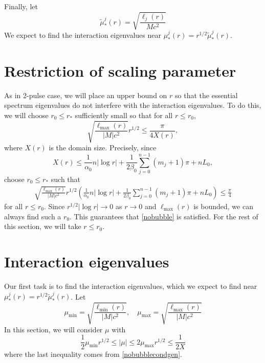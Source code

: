 \documentclass[thesis.tex]{subfiles}
\begin{document}
Finally, let
\[
\tilde{\mu}_*^j(r) = \sqrt{\frac{\ell_j(r)}{M c^2}}
\]
We expect to find the interaction eigenvalues near $\mu_*^j(r) = r^{1/2} \tilde{\mu}_*^j(r)$.

\section{Restriction of scaling parameter}

As in 2-pulse case, we will place an upper bound on $r$ so that the essential spectrum eigenvalues do not interfere with the interaction eigenvalues. To do this, we will choose $r_0 \leq r_*$ sufficiently small so that for all $r \leq r_0$,
\begin{equation}\label{nobubble}
\sqrt{\frac{\ell_{\max}(r)}{|M| c^2 }} r^{1/2}  \leq \frac{\pi}{4 X(r)},
\end{equation}
where $X(r)$ is the domain size. Precisely, since
\[
X(r) \leq \frac{1}{\alpha_0} n |\log r| + \frac{1}{2\beta_0} \sum_{j = 0}^{n-1} (m_j + 1)\pi + n L_0, 
\]
choose $r_0 \leq r_*$ such that
\begin{align}\label{nobubblecond}
\sqrt{\frac{\ell_{\max}(r)}{|M|c^2}} r^{1/2} \left( \frac{1}{\alpha_0} n |\log r| + \frac{1}{2\beta_0} \sum_{j = 0}^{n-1} (m_j + 1)\pi + n L_0 \right) \leq \frac{\pi}{4}
\end{align}
for all $r \leq r_0$. Since $r^{1/2}|\log r| \rightarrow 0$ as $r \rightarrow 0$ and $\ell_{\max}(r)$ is bounded, we can always find such a $r_0$. This guarantees that \cref{nobubble} is satisfied. For the rest of this section, we will take $r \leq r_0$. 

\section{Interaction eigenvalues}

Our first task is to find the interaction eigenvalues, which we expect to find near $\mu_*^j(r) = r^{1/2} \tilde{\mu}_*^j(r)$. Let
\begin{equation}\label{muminmax}
\mu_{\min} = \sqrt{\frac{\ell_{\min}(r)}{|M| c^2 }}, \quad
\mu_{\max} = \sqrt{\frac{\ell_{\max}(r)}{|M| c^2 }} 
\end{equation}
In this section, we will consider $\mu$ with
\begin{equation}\label{mucondition}
\frac{1}{2} \mu_{\min} r^{1/2} \leq |\mu| \leq 2 \mu_{\max} r^{1/2} \leq \frac{1}{2X}
\end{equation}
where the last inequality comes from \cref{nobubblecondgen}.
\end{document}
